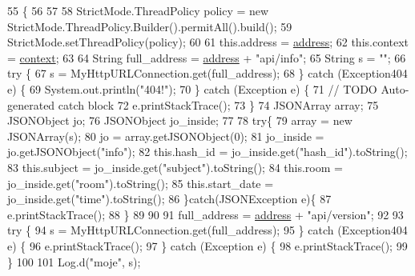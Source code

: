 \begin{DoxyCode}
55                                                                     \{
56         
57         
58         StrictMode.ThreadPolicy policy = \textcolor{keyword}{new} StrictMode.ThreadPolicy.Builder().permitAll().build(); 
59         StrictMode.setThreadPolicy(policy);
60         
61         this.address = \hyperlink{classcom_1_1example_1_1qrpoll_1_1_poll_a284d664b1db022d0fe8f089c4cad5ead}{address};
62         this.context = \hyperlink{classcom_1_1example_1_1qrpoll_1_1_poll_a22159bb6ccaf5330c7691c47fcb0ea00}{context};
63         
64         String full\_address = \hyperlink{classcom_1_1example_1_1qrpoll_1_1_poll_a284d664b1db022d0fe8f089c4cad5ead}{address} + \textcolor{stringliteral}{"api/info"};
65         String s = \textcolor{stringliteral}{""};
66         \textcolor{keywordflow}{try} \{
67             s = MyHttpURLConnection.get(full\_address);
68         \} \textcolor{keywordflow}{catch} (Exception404 e) \{
69             System.out.println(\textcolor{stringliteral}{"404!"});
70         \} \textcolor{keywordflow}{catch} (Exception e) \{
71             \textcolor{comment}{// TODO Auto-generated catch block}
72             e.printStackTrace();
73         \}
74         JSONArray array;
75         JSONObject jo;
76         JSONObject jo\_inside;
77         
78         \textcolor{keywordflow}{try}\{
79             array = \textcolor{keyword}{new} JSONArray(s);
80             jo = array.getJSONObject(0);
81             jo\_inside = jo.getJSONObject(\textcolor{stringliteral}{"info"}); 
82             this.hash\_id = jo\_inside.get(\textcolor{stringliteral}{"hash\_id"}).toString();
83             this.subject = jo\_inside.get(\textcolor{stringliteral}{"subject"}).toString();
84             this.room = jo\_inside.get(\textcolor{stringliteral}{"room"}).toString();
85             this.start\_date =  jo\_inside.get(\textcolor{stringliteral}{"time"}).toString();
86         \}\textcolor{keywordflow}{catch}(JSONException e)\{
87             e.printStackTrace();
88         \}
89         
90         
91         full\_address = \hyperlink{classcom_1_1example_1_1qrpoll_1_1_poll_a284d664b1db022d0fe8f089c4cad5ead}{address} + \textcolor{stringliteral}{"api/version"};
92         
93         \textcolor{keywordflow}{try} \{
94             s = MyHttpURLConnection.get(full\_address);
95         \} \textcolor{keywordflow}{catch} (Exception404 e) \{
96             e.printStackTrace();
97         \} \textcolor{keywordflow}{catch} (Exception e) \{
98             e.printStackTrace();
99         \}
100         
101         Log.d(\textcolor{stringliteral}{"moje"}, s);

\end{DoxyCode}
